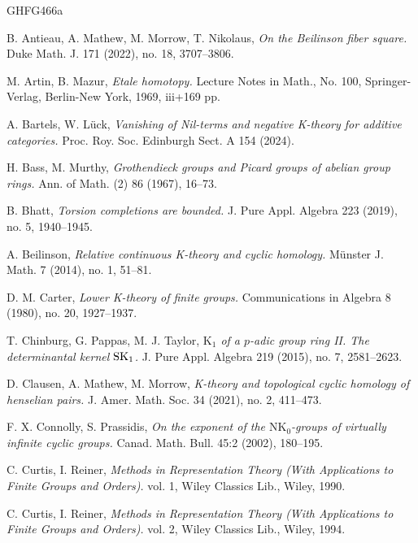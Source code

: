 \documentclass[reqno,11pt,letterpaper]{amsart}
\theoremstyle{plain}
\numberwithin{equation}{subsection}
\theoremstyle{remark}
\theoremstyle{plain}
\theoremstyle{definition}\newtheorem*{notation}{Notation}
\newcommand{\RK}{\mathrm{K}}
\newcommand{\RNK}{\mathrm{NK}}
\begin{document}
\begin{thebibliography}{GHFG466a}

 B. Antieau, A. Mathew, M. Morrow, T. Nikolaus, 
\textit{On the Beilinson fiber square.}
Duke Math. J. 171 (2022), no. 18, 3707--3806.
 
 M. Artin, B. Mazur, \emph{Etale homotopy.}
Lecture Notes in Math., No. 100,
Springer-Verlag, Berlin-New York, 1969, iii+169 pp.
 

 A. Bartels, W. Lück, \emph{Vanishing of Nil-terms and negative K-theory for additive categories.} Proc. Roy. Soc. Edinburgh Sect. A 154 (2024).


 
   
  H. Bass, M. Murthy,
\textit{Grothendieck groups and Picard groups of abelian group rings.} 
Ann. of Math. (2) 86 (1967), 16--73. 


  B. Bhatt, \emph{Torsion completions are bounded.} J. Pure Appl. Algebra 223 (2019), no. 5, 1940--1945.

 A. Beilinson, \textit{Relative continuous K-theory and cyclic homology.} M\"unster J. Math. 7 (2014), no. 1, 51--81.

 D. M. Carter, \emph{Lower K-theory of finite groups.} Communications in Algebra 8 (1980), no. 20, 1927--1937.
 


 T. Chinburg, G. Pappas, M. J. Taylor,   \textit{$\RK_1$  of a  $p$-adic group ring II. The determinantal kernel  ${\rm SK}_1$.} J. Pure Appl. Algebra 219 (2015), no. 7, 2581--2623.



 D. Clausen, A. Mathew, M. Morrow,  \textit{K-theory and topological cyclic homology of henselian pairs.} J. Amer. Math. Soc. 34 (2021), no. 2, 411--473. 

 F. X. Connolly, S. Prassidis, \emph{On the exponent of the $\RNK_0$-groups
of virtually infinite cyclic groups.} Canad. Math. Bull. 45:2 (2002), 180--195.

 

 C. Curtis, I. Reiner, \textit{Methods in Representation Theory (With Applications to Finite Groups and Orders).} vol. 1, Wiley Classics Lib., Wiley, 1990.

 C. Curtis, I. Reiner, \textit{Methods in Representation Theory (With Applications to Finite Groups and Orders).} vol. 2, Wiley Classics Lib., Wiley, 1994. 


\end{thebibliography}
\end{document}
